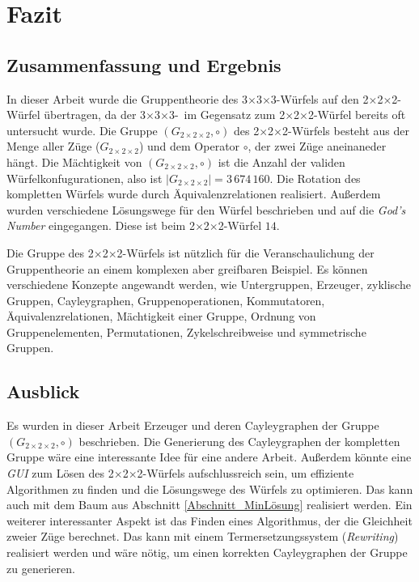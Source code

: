 \documentclass[12pt,a4paper, usenames, dvipsnames]{article}
\theoremstyle{mystyle}
\theoremstyle{definition}
\newcommand{\Gtwo}{\ensuremath{G_{2\times 2\times 2}}}
\newcommand{\Ttwo}{2$\times$2$\times$2-}
\newcommand{\Tthree}{3$\times$3$\times$3-}
\begin{document}
%
%
%
%
%
%
%
%
%
%
%
%
%
%
%
%
%
%

\newpage
\section{Fazit}

\label{Kapitel_Fazit}


%
%
%
%
%
%
%
%
%
%
%
%
%
%
%
%
%
%
%
%
\subsection{Zusammenfassung und Ergebnis}

In dieser Arbeit wurde die Gruppentheorie des \Tthree Würfels auf den \Ttwo Würfel übertragen, da der \Tthree \ im Gegensatz zum \Ttwo Würfel bereits oft untersucht wurde. Die Gruppe $(\Gtwo, \circ)$ des \Ttwo Würfels besteht aus der Menge aller Züge ($\Gtwo$) und dem Operator $\circ$, der zwei Züge aneinaneder hängt. Die Mächtigkeit von $(\Gtwo, \circ)$ ist die Anzahl der validen Würfelkonfugurationen, also ist $|\Gtwo| = 3 \, 674 \, 160$. Die Rotation des kompletten Würfels wurde durch Äquivalenzrelationen realisiert. Außerdem wurden verschiedene Lösungswege für den Würfel beschrieben und auf die \textit{God's Number} eingegangen. Diese ist beim \Ttwo Würfel $14$.

Die Gruppe des \Ttwo Würfels ist nützlich für die Veranschaulichung der Gruppentheorie an einem komplexen aber greifbaren Beispiel. Es können verschiedene Konzepte angewandt werden, wie Untergruppen, Erzeuger, zyklische Gruppen, Cayleygraphen, Gruppenoperationen, Kommutatoren, Äquivalenzrelationen, Mächtigkeit einer Gruppe, Ordnung von Gruppenelementen, Permutationen, Zykelschreibweise und symmetrische Gruppen.

%
%
%
%
%
%
%
%
%
%
%
%
%
%
%
%
%
%
%
\subsection{Ausblick}

Es wurden in dieser Arbeit Erzeuger und deren Cayleygraphen der Gruppe $(\Gtwo, \circ)$ beschrieben. Die Generierung des Cayleygraphen der kompletten Gruppe wäre eine interessante Idee für eine andere Arbeit. Außerdem könnte eine \textit{GUI} zum Lösen des \Ttwo Würfels aufschlussreich sein, um effiziente Algorithmen zu finden und die Lösungswege des Würfels zu optimieren. Das kann auch mit dem Baum aus Abschnitt \ref{Abschnitt_MinLösung} realisiert werden.
Ein weiterer interessanter Aspekt ist das Finden eines Algorithmus, der die Gleichheit zweier Züge berechnet. Das kann mit einem Termersetzungssystem (\textit{Rewriting}) realisiert werden und wäre nötig, um einen korrekten Cayleygraphen der Gruppe zu generieren.
\end{document}

